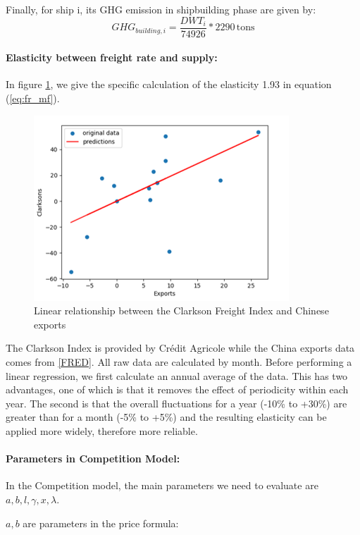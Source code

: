 \documentclass[a4paper,12pt]{article}
\begin{document}
Finally, for ship i, its GHG emission in shipbuilding phase are given by:
\begin{equation}
	GHG_{building,i} = \dfrac{DWT_i}{74926} * 2290 \, \text{tons}
	\label{eq:shipbuilding}
\end{equation}

\paragraph{Elasticity between freight rate and supply:}
In figure \ref{fig:elasticity}, we give the specific calculation of the elasticity 1.93 in equation (\ref{eq:fr_mf}).\\

\begin{figure}[htbp]
	\centering
	\includegraphics[width=0.5\linewidth]{report-fig/Elasticity.png}
	\caption{Linear relationship between the Clarkson Freight Index and Chinese exports}
	\label{fig:elasticity}
\end{figure}

The Clarkson Index is provided by Crédit Agricole while the China exports data comes from \href{https://fred.stlouisfed.org/series/XTEXVA01CNM667S}{[FRED]}.
All raw data are calculated by month.
Before performing a linear regression, we first calculate an annual average of the data.
This has two advantages, one of which is that it removes the effect of periodicity within each year.
The second is that the overall fluctuations for a year (-10\% to +30\%) are greater than for a month (-5\% to +5\%) and the resulting elasticity can be applied more widely, therefore more reliable.

\paragraph{Parameters in Competition Model:} In the Competition model, the main parameters we need to evaluate are $a, b, l, \gamma, x, \lambda$.

$a,b$ are parameters in the price formula:
\end{document}
